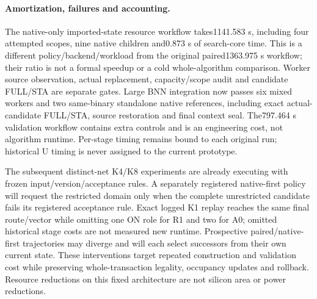 \paragraph{Amortization, failures and accounting.}
The native-only imported-state resource workflow takes1141.583 s, including four attempted scopes, nine native children and0.873 s of search-core time. This is a different policy/backend/workload from the original paired1363.975 s workflow; their ratio is not a formal speedup or a cold whole-algorithm comparison. Worker source observation, actual replacement, capacity/scope audit and candidate FULL/STA are separate gates. Large BNN integration now passes six mixed workers and two same-binary standalone native references, including exact actual-candidate FULL/STA, source restoration and final context seal. The797.464 s validation workflow contains extra controls and is an engineering cost, not algorithm runtime. Per-stage timing remains bound to each original run; historical U timing is never assigned to the current prototype.

The subsequent distinct-net K4/K8 experiments are already executing with frozen input/version/acceptance rules. A separately registered native-first policy will request the restricted domain only when the complete unrestricted candidate fails its registered acceptance rule. Exact logged K1 replay reaches the same final route/vector while omitting one ON role for R1 and two for A0; omitted historical stage costs are not measured new runtime. Prospective paired/native-first trajectories may diverge and will each select successors from their own current state. These interventions target repeated construction and validation cost while preserving whole-transaction legality, occupancy updates and rollback. Resource reductions on this fixed architecture are not silicon area or power reductions.
